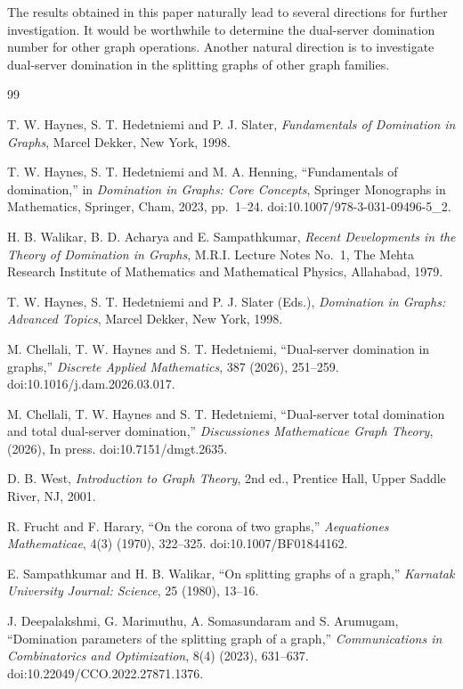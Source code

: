 \documentclass{article}
\begin{document}
The results obtained in this paper naturally lead to several directions for further investigation. It would be worthwhile to determine the dual-server domination number for other graph operations. Another natural direction is to investigate dual-server domination in the splitting graphs of other graph families.
%
%
\begin{thebibliography}{99}

T. W. Haynes, S. T. Hedetniemi and P. J. Slater,
\emph{Fundamentals of Domination in Graphs},
Marcel Dekker, New York, 1998.

T. W. Haynes, S. T. Hedetniemi and M. A. Henning,
``Fundamentals of domination,''
in \emph{Domination in Graphs: Core Concepts},
Springer Monographs in Mathematics,
Springer, Cham, 2023, pp.~1--24.
doi:10.1007/978-3-031-09496-5\_2.

H. B. Walikar, B. D. Acharya and E. Sampathkumar,
\emph{Recent Developments in the Theory of Domination in Graphs},
M.R.I. Lecture Notes No.~1,
The Mehta Research Institute of Mathematics and Mathematical Physics,
Allahabad, 1979.

T. W. Haynes, S. T. Hedetniemi and P. J. Slater (Eds.),
\emph{Domination in Graphs: Advanced Topics},
Marcel Dekker, New York, 1998.

M. Chellali, T. W. Haynes and S. T. Hedetniemi,
``Dual-server domination in graphs,''
\emph{Discrete Applied Mathematics},
387 (2026), 251--259.
doi:10.1016/j.dam.2026.03.017.

M. Chellali, T. W. Haynes and S. T. Hedetniemi,
``Dual-server total domination and total dual-server domination,''
\emph{Discussiones Mathematicae Graph Theory},
(2026), In press.
doi:10.7151/dmgt.2635.

D. B. West,
\emph{Introduction to Graph Theory},
2nd ed.,
Prentice Hall,
Upper Saddle River, NJ, 2001.

R. Frucht and F. Harary,
``On the corona of two graphs,''
\emph{Aequationes Mathematicae},
4(3) (1970), 322--325.
doi:10.1007/BF01844162.

E. Sampathkumar and H. B. Walikar,
``On splitting graphs of a graph,''
\emph{Karnatak University Journal: Science},
25 (1980), 13--16.

J. Deepalakshmi, G. Marimuthu, A. Somasundaram and S. Arumugam,
``Domination parameters of the splitting graph of a graph,''
\emph{Communications in Combinatorics and Optimization},
8(4) (2023), 631--637.
doi:10.22049/CCO.2022.27871.1376.

\end{thebibliography}
\end{document}
